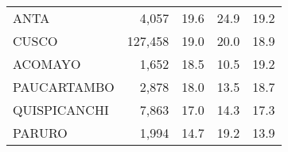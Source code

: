 \begin{tabular}{lrrrr}
	\cellcolor[HTML]{FD6864}ANTA                                            & 4,057                                                                 & 19.6                                                                             & 24.9                                                                        & 19.2                                                                                \\
	\cellcolor[HTML]{FD6864}CUSCO                                           & 127,458                                                               & 19.0                                                                             & 20.0                                                                        & 18.9                                                                                \\
	\cellcolor[HTML]{FD6864}ACOMAYO                                         & 1,652                                                                 & 18.5                                                                             & 10.5                                                                        & 19.2                                                                                \\
	\cellcolor[HTML]{FD6864}PAUCARTAMBO                                     & 2,878                                                                 & 18.0                                                                             & 13.5                                                                        & 18.7                                                                                \\
	\cellcolor[HTML]{FD6864}QUISPICANCHI                                    & 7,863                                                                 & 17.0                                                                             & 14.3                                                                        & 17.3                                                                                \\
	\cellcolor[HTML]{FD6864}PARURO                                          & 1,994                                                                 & 14.7                                                                             & 19.2                                                                        & 13.9                                                                                \\

\end{tabular}
